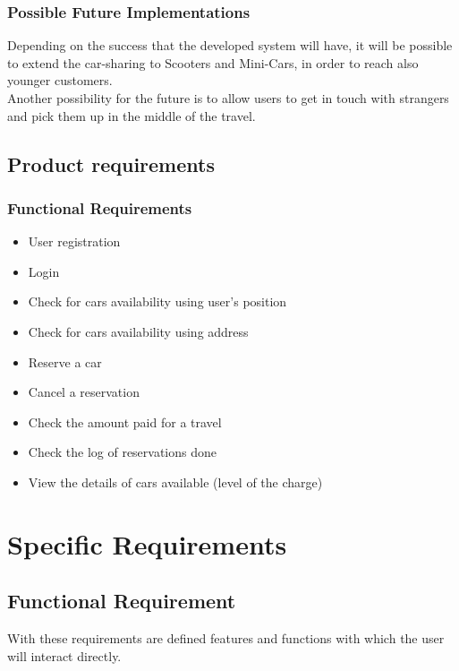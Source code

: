 \documentclass[english]{article}
\newcounter{requirement}
\begin{document}
\subsubsection{Possible Future Implementations}
Depending on the success that the developed system will have, it will be possible to extend the car-sharing to Scooters and Mini-Cars, in order to reach also younger customers.
\\ \noindent 
Another possibility for the future is to allow users to get in touch with strangers and pick them up in the middle of the travel.
\pagebreak{}

\subsection{Product requirements}
\subsubsection{Functional Requirements}

\begin{itemize}
	\item User registration
	\item Login
	\item Check for cars availability using user's position
	\item Check for cars availability using address
	\item Reserve a car
	\item Cancel a reservation
	\item Check the amount paid for a travel
	\item Check the log of reservations done
	\item View the details of cars available (level of the charge)
	
	
\end{itemize}



\pagebreak

\section{Specific Requirements}


\subsection{Functional Requirement}

With these requirements are defined features and functions with which
the user will interact directly.
\end{document}
